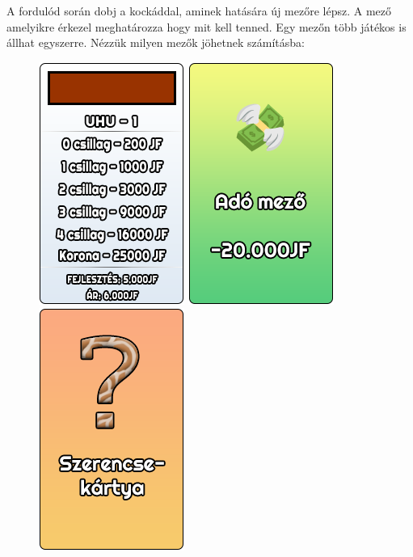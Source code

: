 A fordulód során dobj a kockáddal, aminek hatására új mezőre lépsz. A mező amelyikre érkezel meghatározza hogy mit kell tenned. Egy mezőn több játékos is állhat egyszerre.
\newpage
Nézzük milyen mezők jöhetnek számításba:
\begin{figure}[h!]
\centering
\includegraphics[scale=0.4]{images/p1.png}
\includegraphics[scale=0.4]{images/ado.png}
\includegraphics[scale=0.4]{images/szk.png}

\end{figure}
